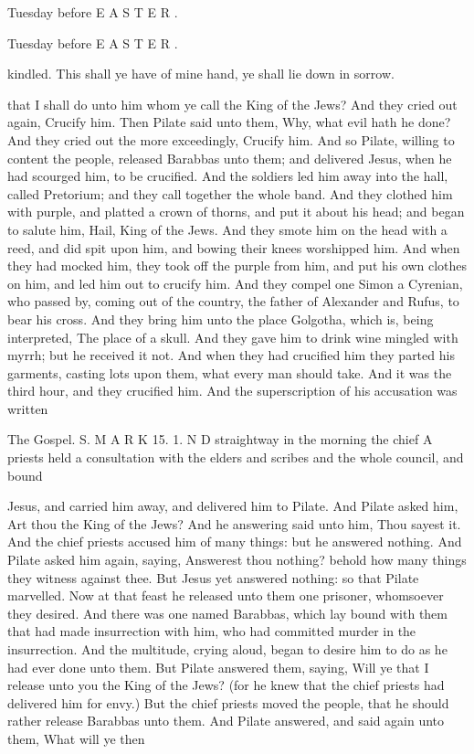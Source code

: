 Tuesday before E A S T E R .

Tuesday before E A S T E R .

kindled. This shall ye have of mine hand, ye shall lie down in sorrow.

that I shall do unto him whom ye call the King of the Jews? And they cried out again, Crucify him. Then Pilate said unto them, Why, what evil hath he done? And they cried out the more exceedingly, Crucify him. And so Pilate, willing to content the people, released Barabbas unto them; and delivered Jesus, when he had scourged him, to be crucified. And the soldiers led him away into the hall, called Pretorium; and they call together the whole band. And they clothed him with purple, and platted a crown of thorns, and put it about his head; and began to salute him, Hail, King of the Jews. And they smote him on the head with a reed, and did spit upon him, and bowing their knees worshipped him. And when they had mocked him, they took off the purple from him, and put his own clothes on him, and led him out to crucify him. And they compel one Simon a Cyrenian, who passed by, coming out of the country, the father of Alexander and Rufus, to bear his cross. And they bring him unto the place Golgotha, which is, being interpreted, The place of a skull. And they gave him to drink wine mingled with myrrh; but he received it not. And when they had crucified him they parted his garments, casting lots upon them, what every man should take. And it was the third hour, and they crucified him. And the superscription of his accusation was written

The Gospel. S. M A R K 15. 1. N D straightway in the morning the chief A priests held a consultation with the elders and scribes and the whole council, and bound

Jesus, and carried him away, and delivered him to Pilate. And Pilate asked him, Art thou the King of the Jews? And he answering said unto him, Thou sayest it. And the chief priests accused him of many things: but he answered nothing. And Pilate asked him again, saying, Answerest thou nothing? behold how many things they witness against thee. But Jesus yet answered nothing: so that Pilate marvelled. Now at that feast he released unto them one prisoner, whomsoever they desired. And there was one named Barabbas, which lay bound with them that had made insurrection with him, who had committed murder in the insurrection. And the multitude, crying aloud, began to desire him to do as he had ever done unto them. But Pilate answered them, saying, Will ye that I release unto you the King of the Jews? (for he knew that the chief priests had delivered him for envy.) But the chief priests moved the people, that he should rather release Barabbas unto them. And Pilate answered, and said again unto them, What will ye then

